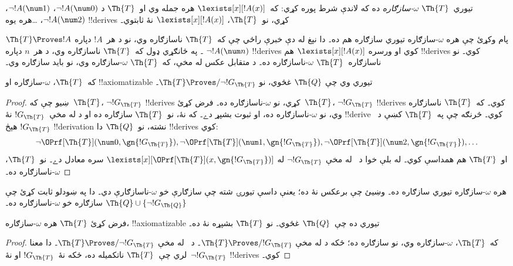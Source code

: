 \documentclass[../../../include/open-logic-section]{subfiles}
\begin{document}
\begin{defn}
تيوري~$\Th{T}$ \emph{$\omega$-سازګاره} ده که لاندې شرط پوره کړي:
که~$\lexists[x][!A(x)]$ هره جمله وي او~$\Th{T}$ د
$\lnot !A(\num 0)$، $\lnot !A(\num 1)$، $\lnot !A(\num 2)$،
\dots هره يوه !!{derive}s کړي، نو~$\Th{T}$،
$\lexists[x][!A(x)]$ نۀ ثابتوي۔
\end{defn}

پام وکړئ چې هره $\omega$-سازګاره تيوري سازګاره هم ده۔ دا نېغ له
دې خبرې راځي چې که~$\Th{T}$ ناسازګاره وي، نو د هر~$!A$ دپاره
$\Th{T} \Proves !A$۔ په ځانګړي ډول که~$\Th{T}$ ناسازګاره وي، د
هر~$n$ دپاره $\lnot !A(\num n)$ !!{derive}s کوي او ورسره
$\lexists[x][!A(x)]$ هم !!{derive}s کوي۔ نو ناسازګاره~$\Th{T}$
$\omega$-ناسازګاره ده۔ د متقابل عکس له مخې، که~$\Th{T}$
$\omega$-سازګاره وي، نو بايد سازګاره وي۔

\begin{lem}
که~$\Th{T}$، $\omega$-سازګاره او !!{axiomatizable} تيوري وي چې
$\Th{Q}$ غځوي، نو $\Th{T} \Proves/ \lnot !G_\Th{T}$۔
\end{lem}

\begin{proof}
ښيو چې که~$\Th{T}$، $\lnot !G_\Th{T}$ !!{derive}s کړي، نو
$\omega$-ناسازګاره ده۔ فرض کړئ~$\Th{T}$، $\lnot !G_\Th{T}$
!!{derive}s کوي۔ که~$\Th{T}$ ناسازګاره وي، نو $\omega$-ناسازګاره
ده، او ثبوت بشپړ دے۔ که نۀ، نو~$\Th{T}$ سازګاره ده او د
 له مخې~$!G_\Th{T}$ نۀ !!{derive} کوي۔
څرنګه چې په~$\Th{T}$ کښې د~$!G_\Th{T}$ هېڅ !!{derivation} نشته،
نو~$\Th{Q}$ دا !!{derive}s کوي:
\[
\lnot \OPrf[\Th{T}](\num 0, \gn{!G_\Th{T}}), \lnot \OPrf[\Th{T}](\num 1,
\gn{!G_\Th{T}}), \lnot \OPrf[\Th{T}](\num 2, \gn{!G_\Th{T}}), \dots
\]
او~$\Th{T}$ هم همداسې کوي۔ له بلې خوا د~ له مخې
$\lnot !G_\Th{T}$ له
$\lexists[x][\OPrf[\Th{T}](x,\gn{!G_\Th{T}})]$ سره معادل دے۔
نو~$\Th{T}$، $\omega$-ناسازګاره ده۔
\end{proof}

\begin{prob}
  هره $\omega$-سازګاره تيوري سازګاره ده۔ وښيئ چې برعکس نۀ ده؛
  يعنې داسې تيورۍ شته چې سازګارې خو $\omega$-ناسازګارې دي۔ دا په
  ښودلو ثابت کړئ چې $\Th{Q} \cup
  \{\lnot !G_\Th{Q}\}$ سازګاره خو $\omega$-ناسازګاره ده۔
\end{prob}

\begin{thm}
 فرض کړئ $\Th{T}$ هره
$\omega$-سازګاره، !!{axiomatizable} تيوري ده چې~$\Th{Q}$ غځوي۔ نو
$\Th{T}$ بشپړه نۀ ده۔
\end{thm}

\begin{proof}
  که~$\Th{T}$، $\omega$-سازګاره وي، نو سازګاره ده؛ ځکه د
   له مخې $\Th{T}
  \Proves/ !G_\Th{T}$۔ د~ له مخې
  $\Th{T} \Proves/ \lnot !G_\Th{T}$۔ دا معنا لري چې~$\Th{T}$
  ناتکميله ده، ځکه نۀ~$!G_\Th{T}$ او نۀ~$\lnot !G_\Th{T}$
  !!{derive}s کوي۔
\end{proof}
\end{document}
